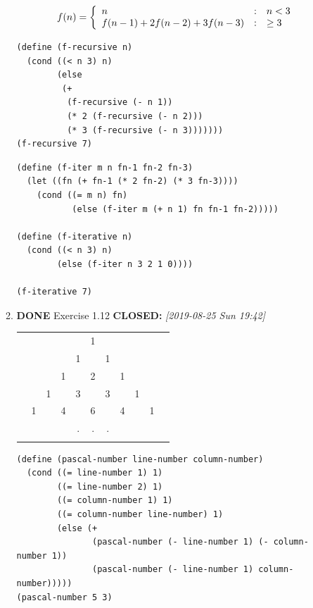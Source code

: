 \documentclass[11pt]{article}
\begin{document}
\begin{enumerate}
\begin{enumerate}
\begin{equation}
\label{eq:4}
f(n)=\left\{
\begin{array}{l@{\quad:\quad}l}
n & n<3\\
f(n-1) + 2f(n-2) + 3f(n-3) & \ge 3
\end{array}\right.
\end{equation}

\lstset{language=Lisp,label= ,caption= ,captionpos=b,numbers=none}
\begin{lstlisting}
(define (f-recursive n)
  (cond ((< n 3) n)
        (else
         (+
          (f-recursive (- n 1))
          (* 2 (f-recursive (- n 2)))
          (* 3 (f-recursive (- n 3)))))))
(f-recursive 7)
\end{lstlisting}

\lstset{language=Lisp,label= ,caption= ,captionpos=b,numbers=none}
\begin{lstlisting}
(define (f-iter m n fn-1 fn-2 fn-3)
  (let ((fn (+ fn-1 (* 2 fn-2) (* 3 fn-3))))
    (cond ((= m n) fn)
           (else (f-iter m (+ n 1) fn fn-1 fn-2)))))

(define (f-iterative n)
  (cond ((< n 3) n)
        (else (f-iter n 3 2 1 0))))

(f-iterative 7)
\end{lstlisting}

\item {\bfseries\sffamily DONE} Exercise 1.12
\label{sec:org2640b87}
\noindent\textbf{CLOSED:} \textit{[2019-08-25 Sun 19:42]}\\

\begin{tabular}{rcccccccccc}
 &    &    &    &    &  1\\\noalign{\smallskip\smallskip}
 &    &    &    &  1 &    &  1\\\noalign{\smallskip\smallskip}
 &    &    &  1 &    &  2 &    &  1\\\noalign{\smallskip\smallskip}
 &    &  1 &    &  3 &    &  3 &    &  1\\\noalign{\smallskip\smallskip}
 &  1 &    &  4 &    &  6 &    &  4 &    &  1\\\noalign{\smallskip\smallskip}
 &    &    &    &  . &  . &  . &    &    &   &   \\\noalign{\smallskip\smallskip}
\end{tabular}

\lstset{language=Lisp,label= ,caption= ,captionpos=b,numbers=none}
\begin{lstlisting}
(define (pascal-number line-number column-number)
  (cond ((= line-number 1) 1)
        ((= line-number 2) 1)
        ((= column-number 1) 1)
        ((= column-number line-number) 1)
        (else (+
               (pascal-number (- line-number 1) (- column-number 1))
               (pascal-number (- line-number 1) column-number)))))
(pascal-number 5 3)
\end{lstlisting}


\end{enumerate}
\end{enumerate}
\end{document}
